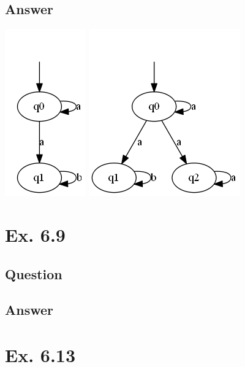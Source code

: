\documentclass[12pt]{article}
\begin{document}
\subsection*{Answer}
\begin{center}
	\includegraphics*[scale=0.8]{ex681.png}
	\includegraphics*[scale=0.8]{ex682.png}
\end{center}

\section*{Ex. 6.9}
\subsection*{Question}

\subsection*{Answer}

\section*{Ex. 6.13}
\end{document}
